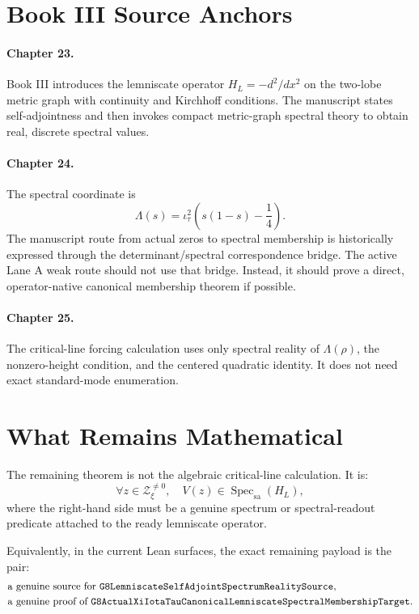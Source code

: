\documentclass[11pt]{article}
\newcommand{\Spec}{\operatorname{Spec}}
\begin{document}
\section*{Book III Source Anchors}

\paragraph{Chapter 23.}
Book III introduces the lemniscate operator \(H_L=-d^2/dx^2\) on the two-lobe
metric graph with continuity and Kirchhoff conditions.  The manuscript states
self-adjointness and then invokes compact metric-graph spectral theory to
obtain real, discrete spectral values.

\paragraph{Chapter 24.}
The spectral coordinate is
\[
  \Lambda(s)=\iota_\tau^2\left(s(1-s)-\frac14\right).
\]
The manuscript route from actual zeros to spectral membership is historically
expressed through the determinant/spectral correspondence bridge.  The active
Lane A weak route should not use that bridge.  Instead, it should prove a
direct, operator-native canonical membership theorem if possible.

\paragraph{Chapter 25.}
The critical-line forcing calculation uses only spectral reality of
\(\Lambda(\rho)\), the nonzero-height condition, and the centered quadratic
identity.  It does not need exact standard-mode enumeration.

\section*{What Remains Mathematical}

The remaining theorem is not the algebraic critical-line calculation.  It is:
\[
  \forall z\in\mathcal Z_\xi^{\ne0},\quad
  V(z)\in\Spec_{\mathrm{sa}}(H_L),
\]
where the right-hand side must be a genuine spectrum or spectral-readout
predicate attached to the ready lemniscate operator.

Equivalently, in the current Lean surfaces, the exact remaining payload is the
pair:
\[
\begin{aligned}
&\text{a genuine source for }
  \verb|G8LemniscateSelfAdjointSpectrumRealitySource|,\\
&\text{a genuine proof of }
  \verb|G8ActualXiIotaTauCanonicalLemniscateSpectralMembershipTarget|.
\end{aligned}
\]
\end{document}
